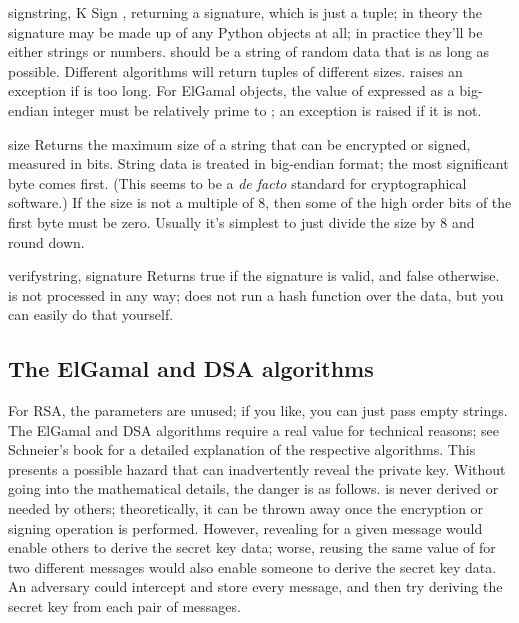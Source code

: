 \documentclass{howto}
\begin{document}
\begin{methoddesc}{sign}{string, K}
Sign , returning a signature, which is just a tuple; in
theory the signature may be made up of any Python objects at all; in
practice they'll be either strings or numbers.   should be a
string of random data that is as long as possible.  Different algorithms
will return tuples of different sizes.   raises an
exception if  is too long.  For ElGamal objects, the value
of  expressed as a big-endian integer must be relatively prime to
; an exception is raised if it is not.
\end{methoddesc}

\begin{methoddesc}{size}{}
Returns the maximum size of a string that can be encrypted or signed,
measured in bits.  String data is treated in big-endian format; the most
significant byte comes first.  (This seems to be a \emph{de facto} standard
for cryptographical software.)  If the size is not a multiple of 8, then
some of the high order bits of the first byte must be zero.  Usually
it's simplest to just divide the size by 8 and round down.
\end{methoddesc}

\begin{methoddesc}{verify}{string, signature}
Returns true if the signature is valid, and false otherwise.
 is not processed in any way;  does
not run a hash function over the data, but you can easily do that yourself.
\end{methoddesc}

\subsection{The ElGamal and DSA algorithms}
For RSA, the  parameters are unused; if you like, you can just
pass empty strings.  The ElGamal and DSA algorithms require a real
 value for technical reasons; see Schneier's book for a detailed
explanation of the respective algorithms.  This presents a possible
hazard that can  
inadvertently reveal the private key.  Without going into the
mathematical details, the danger is as follows.  is never derived
or needed by others; theoretically, it can be thrown away once the
encryption or signing operation is performed.  However, revealing
 for a given message would enable others to derive the secret key
data; worse, reusing the same value of  for two different
messages would also enable someone to derive the secret key data.  An
adversary could intercept and store every message, and then try deriving
the secret key from each pair of messages.
\end{document}
